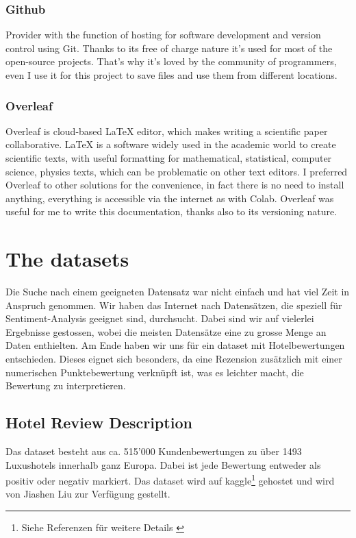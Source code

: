\subsubsection{Github}
Provider with the function of hosting for software development and version control using Git.
Thanks to its free of charge nature it's used for most of the open-source projects.
That's why it's loved by the community of programmers, even I use it for this project to save files and use them from different locations.


\subsubsection{Overleaf}
Overleaf is cloud-based \LaTeX{} editor, which makes writing a scientific paper collaborative. \LaTeX{} is a software widely used in the academic world to create scientific texts, with useful formatting for mathematical, statistical, computer science, physics texts, which can be problematic on other text editors.
I preferred Overleaf to other solutions for the convenience, in fact there is no need to install anything, everything is accessible via the internet as with Colab.
Overleaf was useful for me to write this documentation, thanks also to its versioning nature.

\newpage
\section{The \gls{dataset}s}
Die Suche nach einem geeigneten Datensatz war nicht einfach und hat viel Zeit in Anspruch genommen. Wir haben das Internet nach Datensätzen, die speziell für Sentiment-Analysis geeignet sind, durchsucht. Dabei sind wir auf vielerlei Ergebnisse gestossen\cite{topDataset2020}, wobei die meisten Datensätze eine zu grosse Menge an Daten enthielten. Am Ende haben wir uns für ein \gls{dataset} mit Hotelbewertungen entschieden. Dieses eignet sich besonders, da eine Rezension zusätzlich mit einer numerischen Punktebewertung verknüpft ist, was es leichter macht, die Bewertung zu interpretieren.
\subsection{Hotel Review Description}
Das \gls{dataset} besteht aus ca. 515’000 Kundenbewertungen zu über 1493 Luxushotels innerhalb ganz Europa. Dabei ist jede Bewertung entweder als positiv oder negativ markiert. Das \gls{dataset} wird auf \gls{kaggle}\footnote{Siehe Referenzen für weitere Details \cite{515k_kaggle}} gehostet und wird von Jiashen Liu zur Verfügung gestellt.


